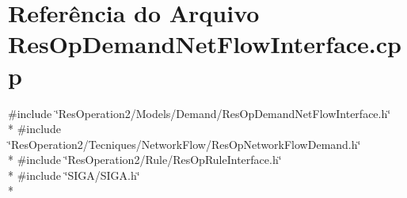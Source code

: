 \section{Referência do Arquivo Res\+Op\+Demand\+Net\+Flow\+Interface.\+cpp}
\label{_res_op_demand_net_flow_interface_8cpp}
{\ttfamily \#include \char`\"{}Res\+Operation2/\+Models/\+Demand/\+Res\+Op\+Demand\+Net\+Flow\+Interface.\+h\char`\"{}}\\*
{\ttfamily \#include \char`\"{}Res\+Operation2/\+Tecniques/\+Network\+Flow/\+Res\+Op\+Network\+Flow\+Demand.\+h\char`\"{}}\\*
{\ttfamily \#include \char`\"{}Res\+Operation2/\+Rule/\+Res\+Op\+Rule\+Interface.\+h\char`\"{}}\\*
{\ttfamily \#include \char`\"{}S\+I\+G\+A/\+S\+I\+G\+A.\+h\char`\"{}}\\*
